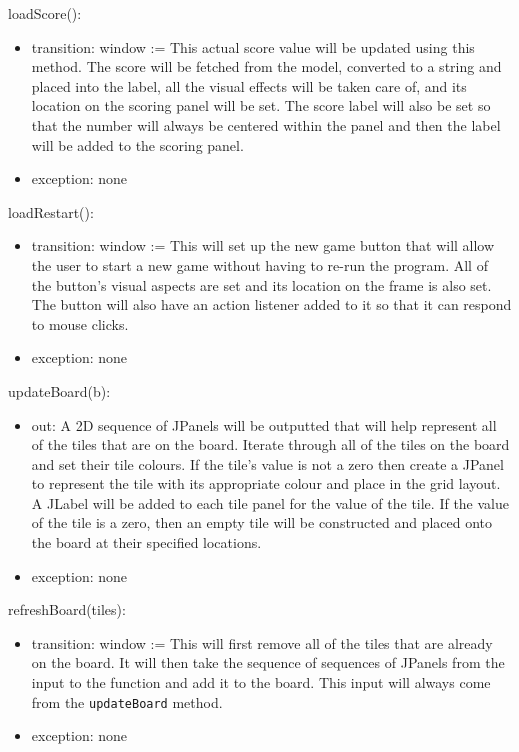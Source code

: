 \documentclass[12pt]{article}
\begin{document}
\noindent loadScore():
\begin{itemize}
\item transition: window := This actual score value will be updated using this method. The score will be fetched from the model, converted to a string and placed into the label, all the visual effects will be taken care of, and its location on the scoring panel will be set. The score label will also be set so that the number will always be centered within the panel and then the label will be added to the scoring panel.
\item exception: none
\end{itemize}

\noindent loadRestart():
\begin{itemize}
\item transition: window := This will set up the new game button that will allow the user to start a new game without having to re-run the program. All of the button's visual aspects are set and its location on the frame is also set. The button will also have an action listener added to it so that it can respond to mouse clicks.  
\item exception: none
\end{itemize}

\noindent updateBoard(b):
\begin{itemize}
\item out: A 2D sequence of JPanels will be outputted that will help represent all of the tiles that are on the board. Iterate through all of the tiles on the board and set their tile colours. If the tile's value is not a zero then create a JPanel to represent the tile with its appropriate colour and place in the grid layout. A JLabel will be added to each tile panel for the value of the tile. If the value of the tile is a zero, then an empty tile will be constructed and placed onto the board at their specified locations. 
\item exception: none
\end{itemize}

\noindent refreshBoard(tiles):
\begin{itemize}
\item transition: window := This will first remove all of the tiles that are already on the board. It will then take the sequence of sequences of JPanels from the input to the function and add it to the board. This input will always come from the \verb|updateBoard| method.  
\item exception: none
\end{itemize}
\end{document}
